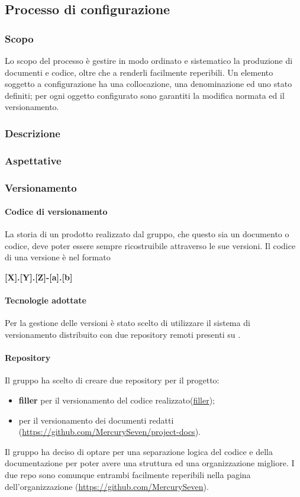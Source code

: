 \subsection{Processo di configurazione}
\subsubsection{Scopo}
Lo scopo del processo è gestire in modo ordinato e sistematico la produzione di documenti e codice, oltre che a renderli facilmente reperibili. Un elemento soggetto a configurazione ha una collocazione, una denominazione ed uno stato definiti; per ogni oggetto configurato sono garantiti la modifica normata ed il versionamento.
\subsubsection{Descrizione}
\subsubsection{Aspettative}
\subsubsection{Versionamento}
\paragraph{Codice di versionamento}
\label{cod-versionamento}
La storia di un prodotto realizzato dal gruppo, che questo sia un documento o codice, deve poter essere sempre ricostruibile attraverso le sue versioni. Il codice di una versione è nel formato\newline
\centerline{\textbf{[X].[Y].[Z]-[a].[b]}}\newline
\paragraph{Tecnologie adottate}
Per la gestione delle versioni è stato scelto di utilizzare il sistema di versionamento distribuito  con due repository remoti presenti su .
\paragraph{Repository}
Il gruppo \textit{\Gruppo{}} ha scelto di creare due repository per il progetto:
\begin{itemize}
	\item \textbf{filler} per il versionamento del codice realizzato(\url{filler});
	\item \textbf{\repoDoc{}} per il versionamento dei documenti redatti (\url{https://github.com/MercurySeven/project-docs}).
\end{itemize}
Il gruppo ha deciso di optare per una separazione logica del codice e della documentazione per poter avere una struttura ed una organizzazione migliore. I due repo sono comunque entrambi facilmente reperibili nella pagina dell'organizzazione (\url{https://github.com/MercurySeven}).
